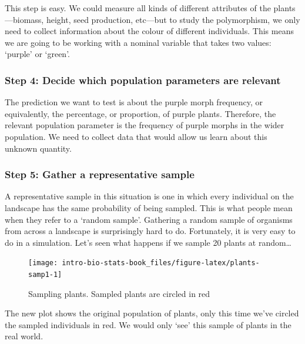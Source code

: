 \documentclass[
]{book}
\begin{document}
This step is easy. We could measure all kinds of different attributes of the plants---biomass, height, seed production, etc---but to study the polymorphism, we only need to collect information about the colour of different individuals. This means we are going to be working with a nominal variable that takes two values: `purple' or `green'.

\hypertarget{step-4-decide-which-population-parameters-are-relevant-1}{%
\subsubsection*{Step 4: Decide which population parameters are relevant}\label{step-4-decide-which-population-parameters-are-relevant-1}}

The prediction we want to test is about the purple morph frequency, or equivalently, the percentage, or proportion, of purple plants. Therefore, the relevant population parameter is the frequency of purple morphs in the wider population. We need to collect data that would allow us learn about this unknown quantity.

\hypertarget{step-5-gather-a-representative-sample-1}{%
\subsubsection*{Step 5: Gather a representative sample}\label{step-5-gather-a-representative-sample-1}}

A representative sample in this situation is one in which every individual on the landscape has the same probability of being sampled. This is what people mean when they refer to a `random sample'. Gathering a random sample of organisms from across a landscape is surprisingly hard to do. Fortunately, it is very easy to do in a simulation. Let's seen what happens if we sample 20 plants at random\ldots{}

\begin{figure}

{\centering \texttt{[image: intro-bio-stats-book\_files/figure-latex/plants-samp1-1]} 

}

\caption{Sampling plants. Sampled plants are circled in red}\label{fig:plants-samp1}
\end{figure}

The new plot shows the original population of plants, only this time we've circled the sampled individuals in red. We would only `see' this sample of plants in the real world.
\end{document}
